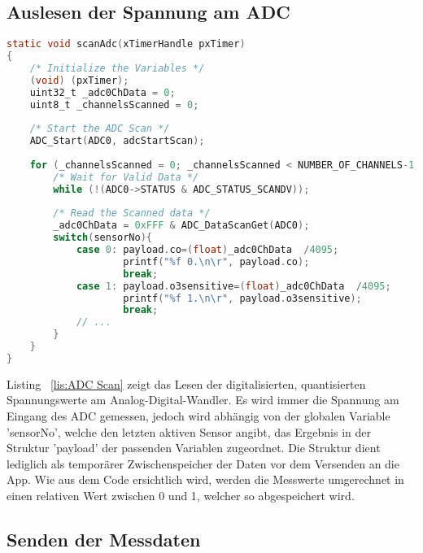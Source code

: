 \subsection{Auslesen der Spannung am \acs{ADC}}\label{subsec:Auslesen der Spannung am ADC}
\begin{lstlisting}[language=C, caption={\acs{ADC} Scan Task}, label=lis:ADC Scan]
static void scanAdc(xTimerHandle pxTimer)
{
	/* Initialize the Variables */
	(void) (pxTimer);
	uint32_t _adc0ChData = 0;
	uint8_t _channelsScanned = 0;
	
	/* Start the ADC Scan */
	ADC_Start(ADC0, adcStartScan);
	
	for (_channelsScanned = 0; _channelsScanned < NUMBER_OF_CHANNELS-1; _channelsScanned++) {
		/* Wait for Valid Data */
		while (!(ADC0->STATUS & ADC_STATUS_SCANDV));
		
		/* Read the Scanned data */
		_adc0ChData = 0xFFF & ADC_DataScanGet(ADC0);
		switch(sensorNo){
			case 0: payload.co=(float)_adc0ChData  /4095;
					printf("%f 0.\n\r", payload.co);
					break;
			case 1: payload.o3sensitive=(float)_adc0ChData  /4095;
					printf("%f 1.\n\r", payload.o3sensitive);
					break;
			// ...
		}
	}
}
\end{lstlisting}
Listing ~\ref{lis:ADC Scan} zeigt das Lesen der digitalisierten, quantisierten Spannungswerte am Analog-Digital-Wandler. Es wird immer die Spannung am Eingang des \acs{ADC} gemessen, jedoch wird abhängig von der globalen Variable 'sensorNo', welche den letzten aktiven Sensor angibt, das Ergebnis in der Struktur 'payload' der passenden Variablen zugeordnet. Die Struktur dient lediglich als temporärer Zwischenspeicher der Daten vor dem Versenden an die App. \newline
\newline
Wie aus dem Code ersichtlich wird, werden die Messwerte umgerechnet in einen relativen Wert zwischen 0 und 1, welcher so abgespeichert wird.
\subsection{Senden der Messdaten}\label{subsec:Senden der Messdaten}


